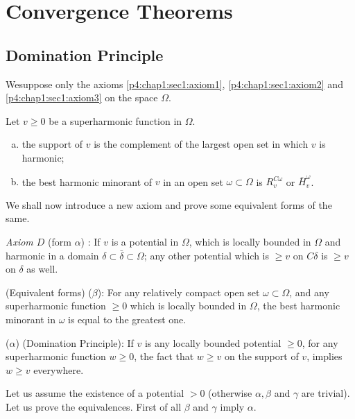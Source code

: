 
\chapter{Convergence Theorems}\label{p4:chap8}%

\setcounter{section}{33}
\section{Domination Principle}\label{p4:chap8:sec34}%

We\pageoriginale suppose only the
axioms \ref{p4:chap1:sec1:axiom1}, \ref{p4:chap1:sec1:axiom2}
and \ref{p4:chap1:sec1:axiom3} on the space $\Omega$.  

\begin{defn}\label{p4:chap8:sec34:def22}%
  Let $v \ge 0$ be a superharmonic function in $\Omega$.
\end{defn}

\begin{enumerate}[(a)]
\item the support of $v$ is the complement of the largest open set in
  which $v$ is harmonic; 
\item the best harmonic minorant of $v$ in an open set $\omega \subset
  \Omega$ is $R^{C \omega}_v$ or $\bar{H}^\omega_v$. 
\end{enumerate}

We shall now introduce a new axiom and prove some equivalent forms of
the same. 

\noindent
\textit{Axiom $D$} (form $\alpha$) : If $v$ is a potential in
$\Omega$, which is locally bounded in $\Omega$ and harmonic in a
domain $\delta \subset \bar{\delta} \subset \Omega$; any other potential which
is $\ge  v$ on $C \delta$ is $\ge  v $ on $\delta$ as well. 

\noindent
(Equivalent forms) ($\beta$): For any relatively compact open set
$\omega \subset \Omega$, and any superharmonic function $\ge 0$ which
is locally bounded in $\Omega$, the best harmonic minorant in $\omega$
is equal to the greatest one. 

($\alpha$) (Domination Principle): If $v$ is any locally bounded
potential $\ge 0$, for any superharmonic function $w \ge 0$, the fact
that $w \ge v$ on the support of $v$, implies $w \ge v$ everywhere. 

Let us assume the existence of a potential $> 0$ (otherwise $\alpha,
\beta$ and $\gamma$ are trivial). Let us prove the equivalences. First
of all $\beta$ and $\gamma$ imply $\alpha$. 

